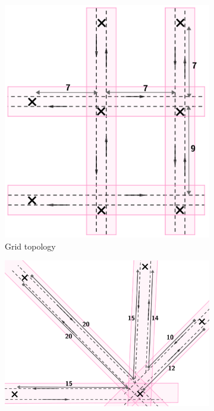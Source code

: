 \documentclass[../../thesis.tex]{subfiles}
\begin{document}
\begin{figure}
\centering
\begin{subfigure}{0.45\textwidth}
    \includegraphics[width=\textwidth]{thesis/picture/topologies/net1.png}
    \caption{Grid topology}
    \label{fig:grid}
\end{subfigure}
\hfill
\begin{subfigure}{0.45\textwidth}
    \includegraphics[width=\textwidth]{thesis/picture/topologies/net2.png}

\end{subfigure}
\end{figure}
\end{document}
